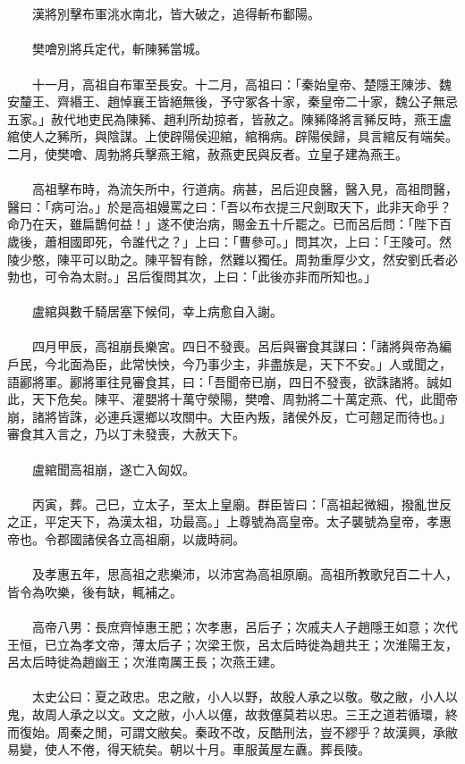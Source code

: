 \\\\
　　漢將別擊布軍洮水南北，皆大破之，追得斬布鄱陽。
\\\\
　　樊噲別將兵定代，斬陳豨當城。
\\\\
　　十一月，高祖自布軍至長安。十二月，高祖曰：「秦始皇帝、楚隱王陳涉、魏安釐王、齊緡王、趙悼襄王皆絕無後，予守冢各十家，秦皇帝二十家，魏公子無忌五家。」赦代地吏民為陳豨、趙利所劫掠者，皆赦之。陳豨降將言豨反時，燕王盧綰使人之豨所，與陰謀。上使辟陽侯迎綰，綰稱病。辟陽侯歸，具言綰反有端矣。二月，使樊噲、周勃將兵擊燕王綰，赦燕吏民與反者。立皇子建為燕王。
\\\\
　　高祖擊布時，為流矢所中，行道病。病甚，呂后迎良醫，醫入見，高祖問醫，醫曰：「病可治。」於是高祖嫚罵之曰：「吾以布衣提三尺劍取天下，此非天命乎？命乃在天，雖扁鵲何益！」遂不使治病，賜金五十斤罷之。已而呂后問：「陛下百歲後，蕭相國即死，令誰代之？」上曰：「曹參可。」問其次，上曰：「王陵可。然陵少憨，陳平可以助之。陳平智有餘，然難以獨任。周勃重厚少文，然安劉氏者必勃也，可令為太尉。」呂后復問其次，上曰：「此後亦非而所知也。」
\\\\
　　盧綰與數千騎居塞下候伺，幸上病愈自入謝。
\\\\
　　四月甲辰，高祖崩長樂宮。四日不發喪。呂后與審食其謀曰：「諸將與帝為編戶民，今北面為臣，此常怏怏，今乃事少主，非盡族是，天下不安。」人或聞之，語酈將軍。酈將軍往見審食其，曰：「吾聞帝已崩，四日不發喪，欲誅諸將。誠如此，天下危矣。陳平、灌嬰將十萬守滎陽，樊噲、周勃將二十萬定燕、代，此聞帝崩，諸將皆誅，必連兵還鄉以攻關中。大臣內叛，諸侯外反，亡可翹足而待也。」審食其入言之，乃以丁未發喪，大赦天下。
\\\\
　　盧綰聞高祖崩，遂亡入匈奴。
\\\\
　　丙寅，葬。己巳，立太子，至太上皇廟。群臣皆曰：「高祖起微細，撥亂世反之正，平定天下，為漢太祖，功最高。」上尊號為高皇帝。太子襲號為皇帝，孝惠帝也。令郡國諸侯各立高祖廟，以歲時祠。
\\\\
　　及孝惠五年，思高祖之悲樂沛，以沛宮為高祖原廟。高祖所教歌兒百二十人，皆令為吹樂，後有缺，輒補之。
\\\\
　　高帝八男：長庶齊悼惠王肥；次孝惠，呂后子；次戚夫人子趙隱王如意；次代王恒，已立為孝文帝，薄太后子；次梁王恢，呂太后時徙為趙共王；次淮陽王友，呂太后時徙為趙幽王；次淮南厲王長；次燕王建。
\\\\
　　太史公曰：夏之政忠。忠之敝，小人以野，故殷人承之以敬。敬之敝，小人以鬼，故周人承之以文。文之敝，小人以僿，故救僿莫若以忠。三王之道若循環，終而復始。周秦之閒，可謂文敝矣。秦政不改，反酷刑法，豈不繆乎？故漢興，承敝易變，使人不倦，得天統矣。朝以十月。車服黃屋左纛。葬長陵。